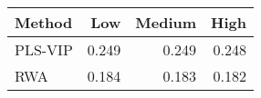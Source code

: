 \begin{small}
\begin{ttfamily}
\begin{tabular}{lrrr}
\toprule
Method & Low & Medium & High \\
\midrule
PLS-VIP & 0.249 & 0.249 & 0.248 \\
RWA & 0.184 & 0.183 & 0.182 \\
\bottomrule
\end{tabular}
\end{ttfamily}
\end{small}
